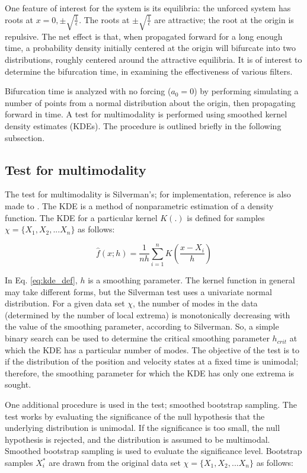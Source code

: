 \documentclass[]{article}
\begin{document}
One feature of interest for the system is its equilibria: the unforced system has roots at $x = 0, \pm \sqrt{\frac{1}{\epsilon}}$. The roots at $\pm \sqrt{\frac{1}{\epsilon}}$ are attractive; the root at the origin is repulsive. The net effect is that, when propagated forward for a long enough time, a probability density initially centered at the origin will bifurcate into two distributions, roughly centered around the attractive equilibria. It is of interest to determine the bifurcation time, in examining the effectiveness of various filters.

Bifurcation time is analyzed with no forcing ($a_0 = 0$) by performing simulating a number of points from a normal distribution about the origin, then propagating forward in time. A test for multimodality is performed using smoothed kernel density estimates (KDEs). The procedure is outlined briefly in the following subsection.

\subsection{Test for multimodality}

The test for multimodality is Silverman's\cite{silverman}; for implementation, reference is also made to \cite{adereth}. The KDE is a method of nonparametric estimation of a density function. The KDE for a particular kernel $K(.)$ is defined for samples $\chi = \{ X_1,X_2,...X_n \}$ as follows:

\begin{equation}
\hat{f}(x;h) = \frac{1}{nh} \sum_{i=1}^{n} K(\frac{x-X_i}{h})
\label{eq:kde_def}
\end{equation}

In Eq. \ref{eq:kde_def}, $h$ is a smoothing parameter. The kernel function in general may take different forms, but the Silverman test uses a univariate normal distribution. For a given data set $\chi$, the number of modes in the data (determined by the number of local extrema) is monotonically decreasing with the value of the smoothing parameter, according to Silverman\cite{silverman}. So, a simple binary search can be used to determine the critical smoothing parameter $h_{crit}$ at which the KDE has a particular number of modes. The objective of the test is to if the distribution of the position and velocity states at a fixed time is unimodal; therefore, the smoothing parameter for which the KDE has only one extrema is sought.

One additional procedure is used in the test; smoothed bootstrap sampling. The test works by evaluating the significance of the null hypothesis that the underlying distribution is unimodal. If the significance is too small, the null hypothesis is rejected, and the distribution is assumed to be multimodal. Smoothed bootstrap sampling is used to evaluate the significance level. Bootstrap samples $X_i^*$ are drawn from the original data set $\chi = \{ X_1,X_2,...X_n \}$ as follows:
\end{document}
